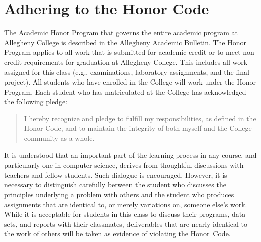 \documentclass[11pt]{article}
\begin{document}
\section*{Adhering to the Honor Code}

The Academic Honor Program that governs the entire academic program at Allegheny
College is described in the Allegheny Academic Bulletin. The Honor Program
applies to all work that is submitted for academic credit or to meet non-credit
requirements for graduation at Allegheny College. This includes all work
assigned for this class (e.g., examinations, laboratory assignments, and the
final project). All students who have enrolled in the College will work under
the Honor Program. Each student who has matriculated at the College has
acknowledged the following pledge:

\vspace*{-.11in}
\begin{quote}
  I hereby recognize and pledge to fulfill my responsibilities, as defined in
  the Honor Code, and to maintain the integrity of both myself and the College
  community as a whole.
\end{quote}
\vspace*{-.11in}

\noindent It is understood that an important part of the learning process in any
course, and particularly one in computer science, derives from thoughtful
discussions with teachers and fellow students. Such dialogue is encouraged.
However, it is necessary to distinguish carefully between the student who
discusses the principles underlying a problem with others and the student who
produces assignments that are identical to, or merely variations on, someone
else's work. While it is acceptable for students in this class to discuss their
programs, data sets, and reports with their classmates, deliverables that are
nearly identical to the work of others will be taken as evidence of violating
the \mbox{Honor Code}.
\end{document}
